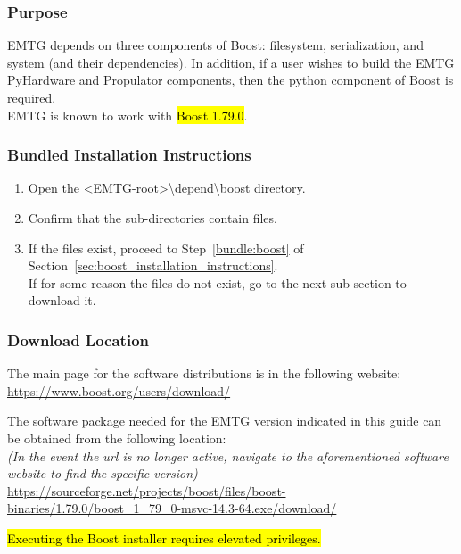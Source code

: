 
\subsubsection{Purpose}
\noindent \ac{EMTG} depends on three components of Boost: filesystem, serialization, and system (and their dependencies). In addition, if a user wishes to build the \ac{EMTG} PyHardware and Propulator components, then the python component of Boost is required. \\ \ac{EMTG} is known to work with \hl{Boost 1.79.0}.

\subsubsection{Bundled Installation Instructions}
\begin{enumerate}
	\item Open the \textless EMTG-root\textgreater \textbackslash depend\textbackslash boost directory.
	\item Confirm that the sub-directories contain files.
	\item If the files exist, proceed to Step~\ref{bundle:boost} of Section~\ref{sec:boost_installation_instructions}. \\ If for some reason the files do not exist, go to the next sub-section to download it.
\end{enumerate}

\subsubsection{Download Location}
\noindent The main page for the software distributions is in the following website: \\
\url{https://www.boost.org/users/download/}

\noindent The software package needed for the EMTG version indicated in this guide can be obtained from the following location: \\
\emph{(In the event the url is no longer active, navigate to the aforementioned software website to find the specific version)} \\
\url{https://sourceforge.net/projects/boost/files/boost-binaries/1.79.0/boost_1_79_0-msvc-14.3-64.exe/download/}

\noindent \hl{Executing the Boost installer requires elevated privileges.}

